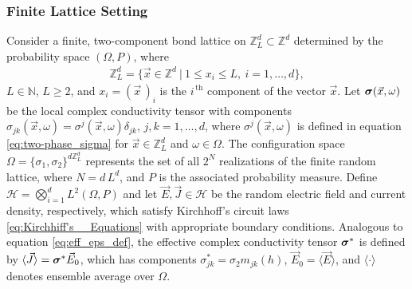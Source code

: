 \documentclass{cmslatex}
\newcommand\bsig{\mbox{\boldmath${\sigma}$}}
\begin{document}
\subsubsection{Finite Lattice Setting}
\label{sec:Finite_Lattice_Setting}
%
Consider a finite, two-component bond lattice on
$\mathbb{Z}_L^d\subset\mathbb{Z}^d$ determined by the probability space
$(\Omega,P)$, where
%
\begin{align}\label{eq:ZLd}
  \mathbb{Z}_L^d=\{\vec{x}\in\mathbb{Z}^d \ | \ 1\leq x_i\leq L, \ i=1,\ldots,d\},   
\end{align}
%
$L\in\mathbb{N}$, $L\geq2$, and $x_i=(\vec{x}\,)_i$ is the $i^{\,\text{th}}$
component of the vector $\vec{x}$. Let $\bsig(\vec{x},\omega)$ be the local
complex conductivity tensor with components
$\sigma_{jk}(\vec{x},\omega)=\sigma^j(\vec{x},\omega)\delta_{jk}$, $j,k=1,\ldots,d$, where
$\sigma^j(\vec{x},\omega)$ is defined in equation \eqref{eq:two-phase_sigma} for
$\vec{x}\in \mathbb{Z}_L^d$ and $\omega\in\Omega$. The configuration space
$\Omega=\{\sigma_1,\sigma_2\}^{d\mathbb{Z}_L^d}$ represents the set of all $2^N$
realizations of the finite random lattice, where $N=d\,L^d$, and $P$ is
the associated probability measure. Define
$\mathscr{H}=\bigotimes_{i=1}^dL^2(\Omega,P)$ and let
$\vec{E},\vec{J}\in \mathscr{H}$ be the random
electric field and current density, respectively, which satisfy
Kirchhoff's circuit laws \eqref{eq:Kirchhiff's__Equations} with
appropriate boundary conditions. Analogous to equation 
\eqref{eq:eff_eps_def}, the effective complex conductivity tensor
$\bsig^*$ is defined by $\langle\vec{J}\rangle=\bsig^*\vec{E}_0$, which
has components $\sigma_{jk}^*=\sigma_2m_{jk}(h)$, $\vec{E}_0=\langle\vec{E}\rangle$, and
$\langle\cdot\rangle$ denotes ensemble average over $\Omega$.
\end{document}
